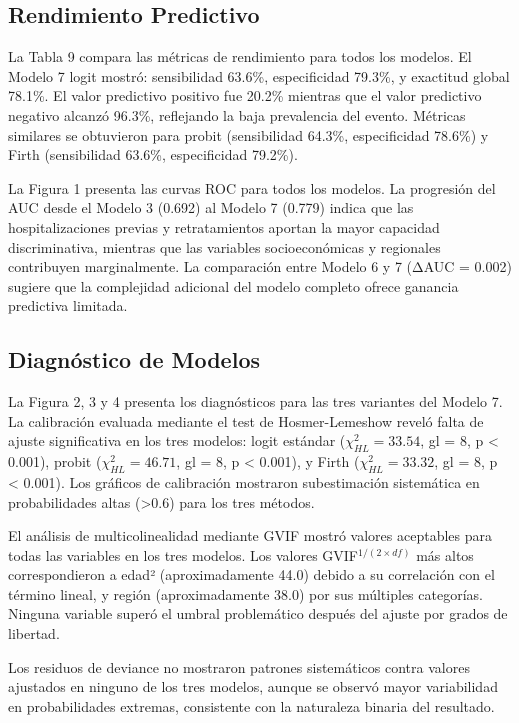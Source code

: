 \documentclass[
  spanish,
  10pt,
]{article}
\begin{document}
\subsection{Rendimiento Predictivo}\label{rendimiento-predictivo}

La Tabla 9 compara las métricas de rendimiento para todos los modelos.
El Modelo 7 logit mostró: sensibilidad 63.6\%, especificidad 79.3\%, y
exactitud global 78.1\%. El valor predictivo positivo fue 20.2\%
mientras que el valor predictivo negativo alcanzó 96.3\%, reflejando la
baja prevalencia del evento. Métricas similares se obtuvieron para
probit (sensibilidad 64.3\%, especificidad 78.6\%) y Firth (sensibilidad
63.6\%, especificidad 79.2\%).

La Figura 1 presenta las curvas ROC para todos los modelos. La
progresión del AUC desde el Modelo 3 (0.692) al Modelo 7 (0.779) indica
que las hospitalizaciones previas y retratamientos aportan la mayor
capacidad discriminativa, mientras que las variables socioeconómicas y
regionales contribuyen marginalmente. La comparación entre Modelo 6 y 7
(ΔAUC = 0.002) sugiere que la complejidad adicional del modelo completo
ofrece ganancia predictiva limitada.

\subsection{Diagnóstico de Modelos}\label{diagnuxf3stico-de-modelos}

La Figura 2, 3 y 4 presenta los diagnósticos para las tres variantes del
Modelo 7. La calibración evaluada mediante el test de Hosmer-Lemeshow
reveló falta de ajuste significativa en los tres modelos: logit estándar
(\(\chi^2_{HL} = 33.54\), gl = 8, p \textless{} 0.001), probit
(\(\chi^2_{HL} = 46.71\), gl = 8, p \textless{} 0.001), y Firth
(\(\chi^2_{HL} = 33.32\), gl = 8, p \textless{} 0.001). Los gráficos de
calibración mostraron subestimación sistemática en probabilidades altas
(\textgreater0.6) para los tres métodos.

El análisis de multicolinealidad mediante GVIF mostró valores aceptables
para todas las variables en los tres modelos. Los valores
GVIF\(^{1/(2 \times df)}\) más altos correspondieron a edad²
(aproximadamente 44.0) debido a su correlación con el término lineal, y
región (aproximadamente 38.0) por sus múltiples categorías. Ninguna
variable superó el umbral problemático después del ajuste por grados de
libertad.

Los residuos de deviance no mostraron patrones sistemáticos contra
valores ajustados en ninguno de los tres modelos, aunque se observó
mayor variabilidad en probabilidades extremas, consistente con la
naturaleza binaria del resultado.
\end{document}
